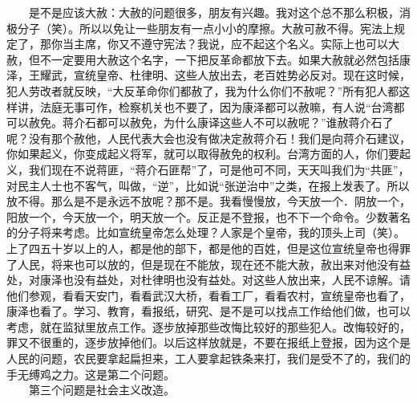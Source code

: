 \documentclass[cn,11pt,chinese]{elegantbook}
\begin{document}
　　是不是应该大赦：大赦的问题很多，朋友有兴趣。我对这个总不那么积极，消极分子（笑）。所以以免让一些朋友有一点小小的摩擦。大赦可赦不得。宪法上规定了，那你当主席，你又不遵守宪法？我说，应不起这个名义。实际上也可以大赦，但不一定要用大赦这个名字，一下把反革命都放下去。如果大赦就必然包括康泽，王耀武，宣统皇帝、杜律明、这些人放出去，老百姓势必反对。现在这时候，犯人劳改者就反映，“大反革命你们都赦了，我为什么你们不赦呢？”所有犯人都这样讲，法庭无事可作，检察机关也不要了，因为康泽都可以赦嘛，有人说“台湾都可以赦免。蒋介石都可以赦免，为什么康译这些人不可以赦呢？”谁赦蒋介石了呢？没有那个赦他，人民代表大会也没有做决定赦蒋介石！我们是向蒋介石建议，你如果起义，你变成起义将军，就可以取得赦免的权利。台湾方面的人，你们要起义，我们现在不说蒋匪，“蒋介石匪帮”了，可是他可不同，天天叫我们为“共匪”，对民主人士也不客气，叫做，“逆”，比如说“张逆治中”之类，在报上发表了。所以放不得。那么是不是永远不放呢？那不是。我看慢慢放，今天放一个．阴放一个，阳放一个，今天放一个，明天放一个。反正是不登报，也不下一个命令。少数著名的分子将来考虑。比如宣统皇帝怎么处理？人家是个皇帝，我的顶头上司（笑）。上了四五十岁以上的人，都是他的部下，都是他的百姓，但是这位宣统皇帝也得罪了人民，将来也可以放的，但是现在不能放，现在还不能大赦，赦出来对他没有益处，对康泽也没有益处，对杜律明也没有益处。对这些人放出来，人民不谅解。请他们参观，看看天安门，看看武汉大桥，看看工厂，看看农村，宣统皇帝也看了，康泽也看了。学习、教育，看报纸，研究、是不是可以找点工作给他们做，也可以考虑，就在监狱里放点工作。逐步放掉那些改悔比较好的那些犯人。改悔较好的，罪又不很重的，逐步放掉他们。以后这样放就是，不要在报纸上登报，因为这个是人民的问题，农民要拿起扁担来，工人要拿起铁条来打，我们是受不了的，我们的手无缚鸡之力。这是第二个问题。\\
　　第三个问题是社会主义改造。\\
\end{document}
